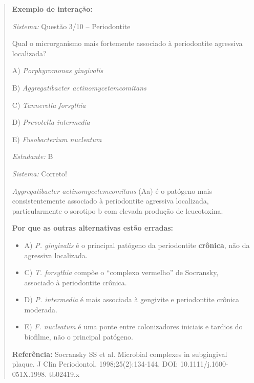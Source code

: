 \begin{quote}
\textbf{Exemplo de interação:}

\textit{Sistema:} Questão 3/10 -- Periodontite

Qual o microrganismo mais fortemente associado à periodontite agressiva
localizada?

A) \textit{Porphyromonas gingivalis}

B) \textit{Aggregatibacter actinomycetemcomitans}

C) \textit{Tannerella forsythia}

D) \textit{Prevotella intermedia}

E) \textit{Fusobacterium nucleatum}

\textit{Estudante:} B

\textit{Sistema:} \textcolor{corTesteSucesso}{Correto!}

\textit{Aggregatibacter actinomycetemcomitans} (Aa) é o patógeno mais
consistentemente associado à periodontite agressiva localizada,
particularmente o sorotipo b com elevada produção de leucotoxina.

\textbf{Por que as outras alternativas estão erradas:}
\begin{itemize}
  \item A) \textit{P. gingivalis} é o principal patógeno da periodontite
    \textbf{crônica}, não da agressiva localizada.
  \item C) \textit{T. forsythia} compõe o ``complexo vermelho'' de Socransky,
    associado à periodontite crônica.
  \item D) \textit{P. intermedia} é mais associada à gengivite e periodontite
    crônica moderada.
  \item E) \textit{F. nucleatum} é uma ponte entre colonizadores iniciais e
    tardios do biofilme, não o principal patógeno.
\end{itemize}

\textbf{Referência:} Socransky SS et al. Microbial complexes in subgingival
plaque. J Clin Periodontol. 1998;25(2):134-144. DOI: 10.1111/j.1600-051X.1998.
tb02419.x
\end{quote}


